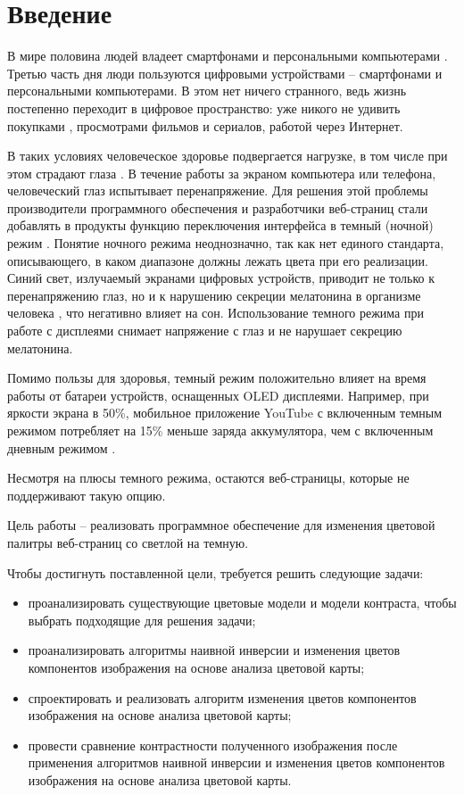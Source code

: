 \chapter*{Введение}

В мире половина людей владеет смартфонами \cite{smartphones} и персональными компьютерами \cite{pcs}. Третью часть дня \cite{digitalconsumption} люди пользуются цифровыми устройствами -- смартфонами и персональными компьютерами. В этом нет ничего странного, ведь жизнь постепенно переходит в цифровое пространство: уже никого не удивить покупками \cite{onlineshopping}, просмотрами фильмов и сериалов, работой через Интернет.

В таких условиях человеческое здоровье подвергается нагрузке, в том числе при этом страдают глаза \cite{digitaleyestrain}. В течение работы за экраном компьютера или телефона, человеческий глаз испытывает перенапряжение.  Для решения этой проблемы производители программного обеспечения и разработчики веб-страниц стали добавлять в продукты функцию переключения интерфейса в темный (ночной) режим  \cite{darkmode}. Понятие ночного режима неоднозначно, так как нет единого стандарта, описывающего, в каком диапазоне должны лежать цвета при его реализации. Синий свет, излучаемый экранами цифровых устройств, приводит не только к перенапряжению глаз, но и к нарушению секреции мелатонина в организме человека \cite{melatonin}, что негативно влияет на сон. Использование темного режима при работе с дисплеями снимает напряжение с глаз и не нарушает секрецию мелатонина.

Помимо пользы для здоровья, темный режим положительно влияет \cite{batterysaving} на время работы от батареи устройств, оснащенных OLED \cite{OLED} дисплеями. Например, при яркости экрана в 50\%, мобильное приложение YouTube \cite{youtube} с включенным темным режимом потребляет на 15\% меньше заряда аккумулятора, чем с включенным дневным режимом \cite{batterysaving}.

Несмотря на плюсы темного режима, остаются веб-страницы, которые не поддерживают такую опцию.

Цель работы -- реализовать программное обеспечение для изменения цветовой палитры веб-страниц со светлой на темную. 

Чтобы достигнуть поставленной цели, требуется решить следующие задачи:
\begin{itemize}
	\item проанализировать существующие цветовые модели и модели контраста, чтобы выбрать подходящие для решения задачи;
	\item проанализировать алгоритмы наивной инверсии и изменения цветов компонентов изображения на основе анализа цветовой карты;
	\item спроектировать и реализовать алгоритм изменения цветов компонентов изображения на основе анализа цветовой карты;
	\item провести сравнение контрастности полученного изображения после применения алгоритмов наивной инверсии и изменения цветов компонентов изображения на основе анализа цветовой карты.
\end{itemize}

